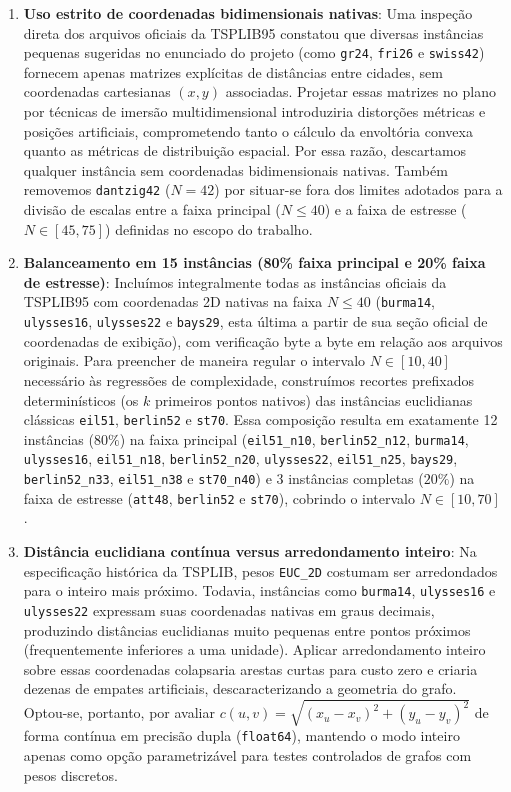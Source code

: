 \begin{enumerate}
  \item \textbf{Uso estrito de coordenadas bidimensionais nativas}: Uma inspeção direta dos
  arquivos oficiais da TSPLIB95 constatou que diversas instâncias pequenas sugeridas
  no enunciado do projeto (como \texttt{gr24}, \texttt{fri26} e \texttt{swiss42}) fornecem apenas matrizes
  explícitas de distâncias entre cidades, sem coordenadas cartesianas $(x, y)$ associadas.
  Projetar essas matrizes no plano por técnicas de imersão multidimensional introduziria
  distorções métricas e posições artificiais, comprometendo tanto o cálculo da envoltória
  convexa quanto as métricas de distribuição espacial. Por essa razão, descartamos qualquer
  instância sem coordenadas bidimensionais nativas. Também removemos \texttt{dantzig42}
  ($N = 42$) por situar-se fora dos limites adotados para a divisão de escalas entre a faixa
  principal ($N \le 40$) e a faixa de estresse ($N \in [45, 75]$) definidas no escopo do trabalho.

  \item \textbf{Balanceamento em 15 instâncias (80\% faixa principal e 20\% faixa de estresse)}:
  Incluímos integralmente todas as instâncias oficiais da TSPLIB95 com coordenadas 2D nativas
  na faixa $N \le 40$ (\texttt{burma14}, \texttt{ulysses16}, \texttt{ulysses22} e
  \texttt{bays29}, esta última a partir de sua seção oficial de coordenadas de exibição), com
  verificação byte a byte em relação aos arquivos originais. Para preencher de maneira regular
  o intervalo $N \in [10, 40]$ necessário às regressões de complexidade, construímos recortes
  prefixados determinísticos (os $k$ primeiros pontos nativos) das instâncias euclidianas
  clássicas \texttt{eil51}, \texttt{berlin52} e \texttt{st70}. Essa composição resulta em
  exatamente 12 instâncias ($80\%$) na faixa principal (\texttt{eil51\_n10},
  \texttt{berlin52\_n12}, \texttt{burma14}, \texttt{ulysses16}, \texttt{eil51\_n18},
  \texttt{berlin52\_n20}, \texttt{ulysses22}, \texttt{eil51\_n25}, \texttt{bays29},
  \texttt{berlin52\_n33}, \texttt{eil51\_n38} e \texttt{st70\_n40}) e 3 instâncias completas
  ($20\%$) na faixa de estresse (\texttt{att48}, \texttt{berlin52} e \texttt{st70}), cobrindo o
  intervalo $N \in [10, 70]$.

  \item \textbf{Distância euclidiana contínua versus arredondamento inteiro}: Na especificação
  histórica da TSPLIB, pesos \texttt{EUC\_2D} costumam ser arredondados para o inteiro mais
  próximo. Todavia, instâncias como \texttt{burma14}, \texttt{ulysses16} e \texttt{ulysses22}
  expressam suas coordenadas nativas em graus decimais, produzindo distâncias euclidianas muito
  pequenas entre pontos próximos (frequentemente inferiores a uma unidade). Aplicar
  arredondamento inteiro sobre essas coordenadas colapsaria arestas curtas para custo zero e
  criaria dezenas de empates artificiais, descaracterizando a geometria do grafo. Optou-se,
  portanto, por avaliar $c(u, v) = \sqrt{(x_u - x_v)^2 + (y_u - y_v)^2}$ de forma contínua em
  precisão dupla (\texttt{float64}), mantendo o modo inteiro apenas como opção parametrizável
  para testes controlados de grafos com pesos discretos.


\end{enumerate}
